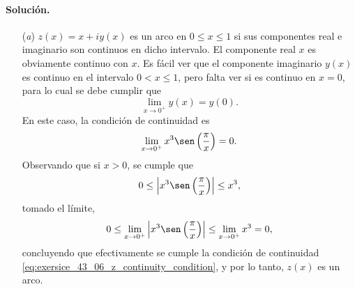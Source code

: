 \documentclass[a4paper]{report}
\begin{document}
\paragraph{Solución.} 
\begin{enumerate}
 \item[(\textit{a})] \(z(x)=x+iy(x)\) es un arco en \(0\leq x\leq1\) si sus componentes real e imaginario son continuos en dicho intervalo. El componente real \(x\) es obviamente continuo con \(x\). Es fácil ver que el componente imaginario \(y(x)\) es continuo en el intervalo \(0<x\leq1\), pero falta ver si es continuo en \(x=0\), para lo cual se debe cumplir que 
\[
 \lim_{x\to0^+}y(x)=y(0).
\]
En este caso, la condición de continuidad es
\begin{equation}\label{eq:exersice_43_06_z_continuity_condition}
  \lim_{x\to0^+}x^3\sen\left(\frac{\pi}{x}\right)=0.
\end{equation}
Observando que si \(x>0\), se cumple que 
\[
 0\leq\left|x^3\sen\left(\frac{\pi}{x}\right)\right|\leq x^3,
\]
tomado el límite, 
\[
 0\leq\lim_{x\to0^+}\left|x^3\sen\left(\frac{\pi}{x}\right)\right|\leq\lim_{x\to0^+}x^3=0,
\]
concluyendo que efectivamente se cumple la condición de continuidad \ref{eq:exersice_43_06_z_continuity_condition}, y por lo tanto, \(z(x)\) es un arco.


\end{enumerate}
\end{document}
